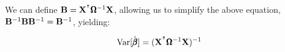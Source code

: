 \documentclass[12pt]{article}
\begin{document}
We can define $\mathbf{B} = \mathbf{X}^{^\intercal} \pmb{\Omega}^{-1} \mathbf{X}$, allowing us to simplify the above equation, $\mathbf{B}^{-1} \mathbf{B} \mathbf{B}^{-1} = \mathbf{B}^{-1}$, yielding:

$$ \mathrm{Var}[ \hat{\pmb{\beta}} ] = (\mathbf{X}^{^\intercal} \pmb{\Omega}^{-1} \mathbf{X})^{-1} $$










\end{document}
